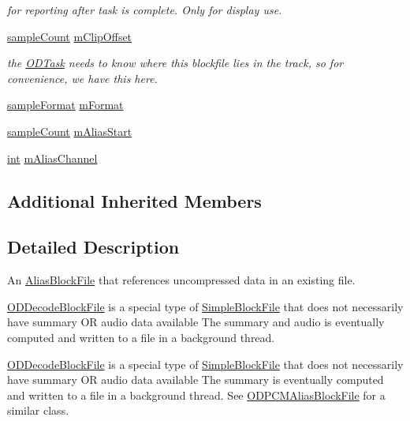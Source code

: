 \begin{DoxyCompactItemize}
\begin{DoxyCompactList}\small\item\em for reporting after task is complete. Only for display use. \end{DoxyCompactList}\item 
\hyperlink{include_2audacity_2_types_8h_afa427e1f521ea5ec12d054e8bd4d0f71}{sample\+Count} \hyperlink{class_o_d_decode_block_file_af07a83b218dc68e77b47055cff66eebc}{m\+Clip\+Offset}
\begin{DoxyCompactList}\small\item\em the \hyperlink{class_o_d_task}{O\+D\+Task} needs to know where this blockfile lies in the track, so for convenience, we have this here. \end{DoxyCompactList}\item 
\hyperlink{include_2audacity_2_types_8h_a9938d2e2f6adef23e745cd80ef379792}{sample\+Format} \hyperlink{class_o_d_decode_block_file_a3e9e037c878345d5fe53457da1dc9c60}{m\+Format}
\item 
\hyperlink{include_2audacity_2_types_8h_afa427e1f521ea5ec12d054e8bd4d0f71}{sample\+Count} \hyperlink{class_o_d_decode_block_file_a7f6e99f0c4cc13857a7ebc53b43be344}{m\+Alias\+Start}
\item 
\hyperlink{xmltok_8h_a5a0d4a5641ce434f1d23533f2b2e6653}{int} \hyperlink{class_o_d_decode_block_file_af79b0bd11b5e3f715a4d4278a526b696}{m\+Alias\+Channel}
\end{DoxyCompactItemize}
\subsection*{Additional Inherited Members}


\subsection{Detailed Description}
An \hyperlink{class_alias_block_file}{Alias\+Block\+File} that references uncompressed data in an existing file. 

\hyperlink{class_o_d_decode_block_file}{O\+D\+Decode\+Block\+File} is a special type of \hyperlink{class_simple_block_file}{Simple\+Block\+File} that does not necessarily have summary OR audio data available The summary and audio is eventually computed and written to a file in a background thread.

\hyperlink{class_o_d_decode_block_file}{O\+D\+Decode\+Block\+File} is a special type of \hyperlink{class_simple_block_file}{Simple\+Block\+File} that does not necessarily have summary OR audio data available The summary is eventually computed and written to a file in a background thread. See \hyperlink{class_o_d_p_c_m_alias_block_file}{O\+D\+P\+C\+M\+Alias\+Block\+File} for a similar class.


